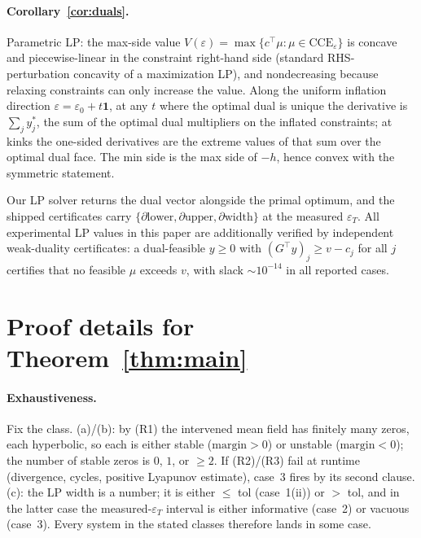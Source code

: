 \documentclass[pmlr]{jmlr}
\newcommand{\CCE}{\mathrm{CCE}}
\newcommand{\margin}{\mathrm{margin}}
\begin{document}
\paragraph{Corollary~\ref{cor:duals}.} Parametric LP: the max-side value
$V(\varepsilon) = \max\{c^\top \mu : \mu \in \CCE_\varepsilon\}$ is concave and piecewise-linear
in the constraint right-hand side (standard RHS-perturbation concavity of a maximization LP),
and nondecreasing because relaxing constraints can only increase the value. Along the uniform
inflation direction $\varepsilon = \varepsilon_0 + t\mathbf{1}$, at any $t$ where the optimal
dual is unique the derivative is $\sum_j y_j^*$, the sum of the optimal dual multipliers on the
inflated constraints; at kinks the one-sided derivatives are the extreme values of that sum over
the optimal dual face. The min side is the max side of $-h$, hence convex with the symmetric
statement. \hfill\BlackBox

\begin{remark}
Our LP solver returns the dual vector alongside the primal optimum, and the shipped
certificates carry $\{\partial\text{lower}, \partial\text{upper}, \partial\text{width}\}$ at the
measured $\varepsilon_T$. All experimental LP values in this paper are additionally verified by
independent weak-duality certificates: a dual-feasible $y \geq 0$ with
$(G^\top y)_j \geq v - c_j$ for all $j$ certifies that no feasible $\mu$ exceeds $v$, with slack
$\sim 10^{-14}$ in all reported cases.
\end{remark}

\section{Proof details for Theorem~\ref{thm:main}}\label{app:main}

\paragraph{Exhaustiveness.} Fix the class. (a)/(b): by (R1) the intervened mean field has
finitely many zeros, each hyperbolic, so each is either stable ($\margin > 0$) or unstable
($\margin < 0$); the number of stable zeros is $0$, $1$, or $\geq 2$. If (R2)/(R3) fail at
runtime (divergence, cycles, positive Lyapunov estimate), case~3 fires by its second clause.
(c): the LP width is a number; it is either $\leq$ tol (case~1(ii)) or $>$ tol, and in the
latter case the measured-$\varepsilon_T$ interval is either informative (case~2) or vacuous
(case~3). Every system in the stated classes therefore lands in some case.
\end{document}
